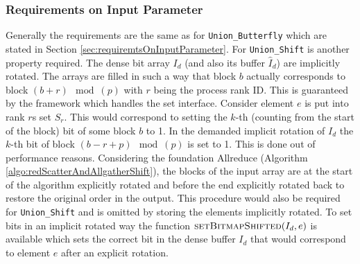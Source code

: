 \subsubsection{Requirements on Input Parameter}
Generally the requirements are the same as for \texttt{Union\_Butterfly} which are stated in Section \ref{sec:requiremtsOnInputParameter}. For \texttt{Union\_Shift} is another property required. The dense bit array $I_d$ (and also its buffer  $\hat{I}_d$) are implicitly rotated. The arrays are filled in such a way that block $b$ actually corresponds to block $(b+r)\mod(p)$ with $r$ being the process rank ID. This is guaranteed by the framework which handles the set interface. Consider element $e$ is put into rank $r$s set $S_r$. This would correspond to setting the $k$-th (counting from the start of the block) bit of some block $b$ to 1. In the demanded implicit rotation of $I_d$ the $k$-th bit of block $(b-r+p)\mod(p)$ is set to 1. This is done out of performance reasons. Considering the foundation Allreduce (Algorithm \ref{algo:redScatterAndAllgatherShift}), the blocks of the input array are at the start of the algorithm explicitly rotated and before the end explicitly rotated back to restore the original order in the output. This procedure would also be required for \texttt{Union\_Shift} and is omitted by storing the elements implicitly rotated. To set bits in an implicit rotated way the function $\Call{setBitmapShifted}{I_d, e}$ is available which sets the correct bit in the dense buffer $I_d$ that would correspond to element $e$ after an explicit rotation. 
 
